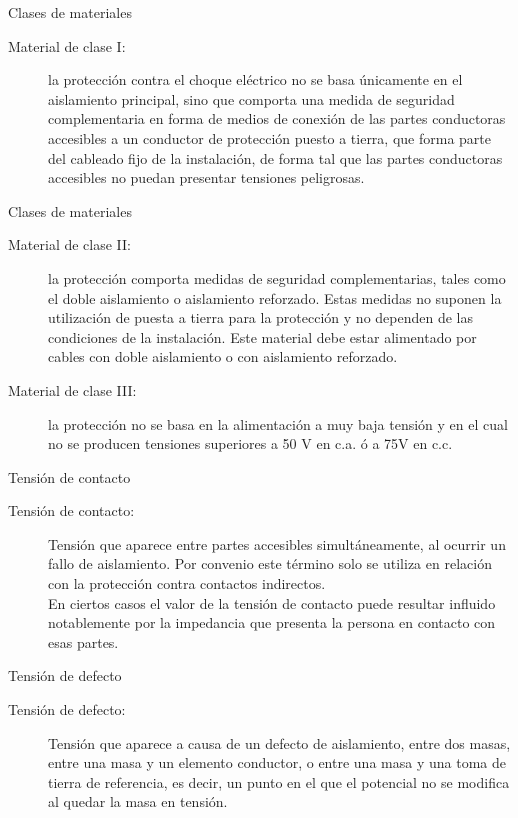\documentclass[xcolor={usenames,svgnames,dvipsnames}]{beamer}
\begin{document}
\begin{frame}[label=sec-1-0-4]{Clases de materiales}
\begin{description}
\item[{Material de clase I:}] la protección contra el choque eléctrico no
se basa únicamente en el aislamiento principal, sino que comporta una
medida de seguridad complementaria en forma de medios de conexión de
las partes conductoras accesibles a un conductor de protección puesto
a tierra, que forma parte del cableado fijo de la instalación, de
forma tal que las partes conductoras accesibles no puedan presentar
tensiones peligrosas.
\end{description}
\end{frame}

\begin{frame}[label=sec-1-0-5]{Clases de materiales}
\begin{description}
\item[{Material de clase II:}] la protección comporta medidas de seguridad
complementarias, tales como el doble aislamiento o aislamiento
reforzado. Estas medidas no suponen la utilización de puesta a tierra
para la protección y no dependen de las condiciones de la
instalación. Este material debe estar alimentado por cables con doble
aislamiento o con aislamiento reforzado.

\item[{Material de clase III:}] la protección no se basa en la alimentación
a muy baja tensión y en el cual no se producen tensiones superiores a
50 V en c.a. ó a 75V en c.c.
\end{description}
\end{frame}

\begin{frame}[label=sec-1-0-6]{Tensión de contacto}
\begin{description}
\item[{Tensión de contacto:}] Tensión que aparece entre partes accesibles
simultáneamente, al ocurrir un fallo de aislamiento. Por convenio
este término solo se utiliza en relación con la protección contra
contactos indirectos.\\
   En ciertos casos el valor de la tensión de contacto puede resultar
influido notablemente por la impedancia que presenta la persona en
contacto con esas partes.
\end{description}
\end{frame}

\begin{frame}[label=sec-1-0-7]{Tensión de defecto}
\begin{description}
\item[{Tensión de defecto:}] Tensión que aparece a causa de un defecto de
aislamiento, entre dos masas, entre una masa y un elemento conductor,
o entre una masa y una toma de tierra de referencia, es decir, un
punto en el que el potencial no se modifica al quedar la masa en
tensión.
\end{description}
\end{frame}
\end{document}
